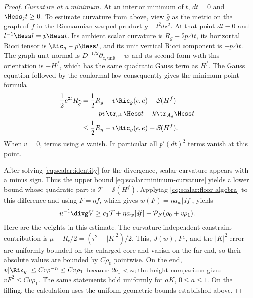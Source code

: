 \begin{proof}
\emph{Curvature at a minimum.} At an interior minimum of $t$,
$dt=0$ and $\Hess_g t\geq0$.
To estimate curvature from above, view $\bar g$ as the metric on the
graph of $f$ in the Riemannian warped product $g+l^2dz^2$.
At that point $dl=0$ and $l^{-1}\Hess l=p\Hess t$.  Its ambient
scalar curvature is $R_g-2p\Delta t$, its horizontal Ricci tensor
is $\Ric_g-p\Hess t$, and its unit vertical Ricci component is
$-p\Delta t$.  The graph unit normal is
$D^{-1/2}\partial_{z,\mathrm{unit}}-w$ and its second form with this
orientation is $-H^f$, which has the same quadratic Gauss term as $H^f$.
The Gauss equation followed by the conformal law consequently gives
the minimum-point formula
\begin{equation}
 \begin{aligned}
 \frac12e^{2t}R_{\widehat g}
 ={}&\frac12R_g-v\Ric_g(e,e)+\mathcal S(H^f)\\
   &-pv\tr_{e^\perp}\Hess t-k\tr_{A_d}\Hess t\\
 \leq{}&\frac12R_g-v\Ric_g(e,e)+\mathcal S(H^f).
 \end{aligned}
 \label{eq:scalar:minimum-curvature}
\end{equation}
When $v=0$, terms using $e$ vanish.  In particular all $p'(dt)^2$
terms vanish at this point.

After solving \eqref{eq:scalar:identity} for the divergence, scalar
curvature appears with a minus sign.  Thus the upper bound
\eqref{eq:scalar:minimum-curvature} yields a lower bound whose
quadratic part is $\mathcal T-\mathcal S(H^f)$.  Applying
\eqref{eq:scalar:floor-algebra} to this difference and using
$F=\eta f$, which gives $w(F)=\eta a_w|df|$, yields
\begin{equation}
 u^{-1}\divg V\geq c_1\mathcal T+\eta a_w|df|
                              -\mathcal P_N(\rho_0+v\rho_1).
 \label{eq:scalar:minimum-flux}
\end{equation}
Here are the weights in this estimate.  The curvature-independent
constraint contribution is
$\mu-R_g/2=(\tau^2-|K|^2)/2$.  This, $J(w)$, $F\tau$, and the
$|K|^2$ error are uniformly bounded on the enlarged core and vanish
on the far end, so their absolute values are bounded by $C\rho_0$
pointwise.  On the end,
$v|\Ric_g|\leq Cv\varrho^{-n}\leq Cv\rho_1$ because $2b_1<n$;
the height comparison gives $vF^2\leq Cv\rho_1$.  The same statements
hold uniformly for $aK$, $0\leq a\leq1$.  On the filling,
the calculation uses the uniform geometric bounds established above.


\end{proof}
